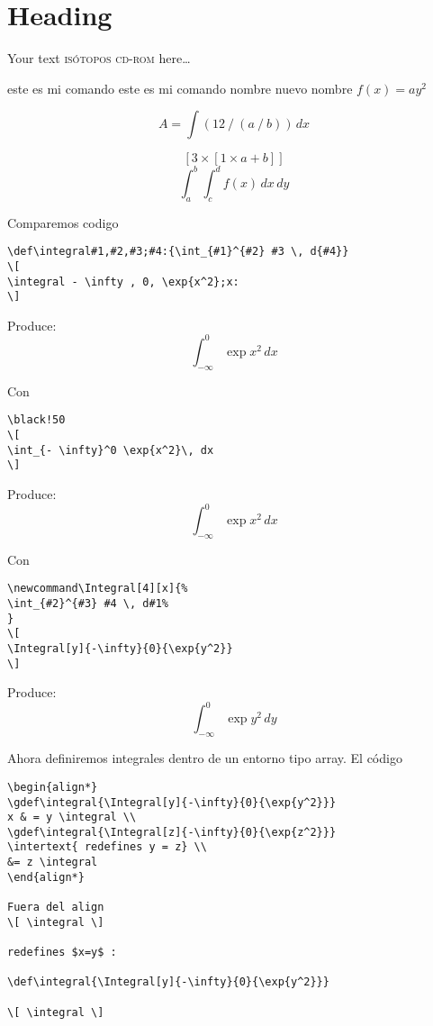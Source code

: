\documentclass[11pt]{article}
\def\hola#1;{este es mi comando #1}
\def\division#1,#2:{\left(#1 \mathbin{/} #2\right)}
\def\multiplica#1,#2:{\left[#1\times #2\right]}
\def\integral#1,#2,#3;#4:{\int_{#1} ^{#2} #3 \,  d#4}
\begin{document}
\selectfont

\section{\textsf{Heading}}

\textsf{Your text \textsc{isótopos cd-rom} here…}

%
%

\hola \hola nombre; nuevo nombre; $f(x) = ay^2$

\[ 
 A = \int \division 12,\division a, b:: \, dx
\]

\[
\multiplica 3, \multiplica 1,a+b::
\] 
\[
\integral a, b, \integral c,d, f(x) ;x: ; y:
\] 


Comparemos codigo 
\begin{verbatim} 
\def\integral#1,#2,#3;#4:{\int_{#1}^{#2} #3 \, d{#4}} 
\[
\integral - \infty , 0, \exp{x^2};x:
\] 
\end{verbatim} 

Produce:
\[
\integral - \infty , 0, \exp{ x^2};x:
\] 

Con 
\begin{verbatim}\black!50
\[
\int_{- \infty}^0 \exp{x^2}\, dx
\] 
\end{verbatim} 

Produce:
\[
\int_{- \infty}^0 \exp{ x^2}\, dx
\]

Con 
{
\color{black!90}
\begin{verbatim} 
\newcommand\Integral[4][x]{%
\int_{#2}^{#3} #4 \, d#1%
} 
\[
\Integral[y]{-\infty}{0}{\exp{y^2}} 
\] 
\end{verbatim} }

Produce:
\newcommand{\Integral}[4][x]{%
\int_{#2}^{#3} #4 \, d#1%
} 
\[
\Integral[y]{-\infty}{0}{\exp{y^2}} 
\] 

Ahora definiremos integrales dentro de un entorno tipo array. El código

\begin{verbatim} 
\begin{align*}
\gdef\integral{\Integral[y]{-\infty}{0}{\exp{y^2}}}
x & = y \integral \\
\gdef\integral{\Integral[z]{-\infty}{0}{\exp{z^2}}} 
\intertext{ redefines y = z} \\
&= z \integral 
\end{align*}

Fuera del align 
\[ \integral \]

redefines $x=y$ :

\def\integral{\Integral[y]{-\infty}{0}{\exp{y^2}}}

\[ \integral \]
\end{verbatim} 
\end{document}
